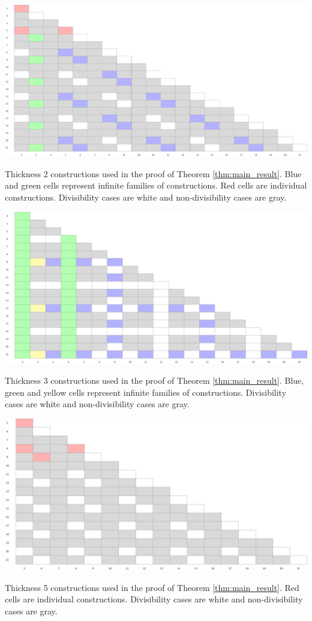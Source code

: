 \begin{table}[]
\centering
\includegraphics[width=\textwidth]{tables/2/thickness_2.pdf}
\caption{Thickness 2 constructions used in the proof of Theorem \ref{thm:main_result}. Blue and green cells represent infinite families of constructions. Red cells are individual constructions. Divisibility cases are white and non-divisibility cases are gray.}
\label{tab:integral_bounds_2}
\end{table} 

\begin{table}[]
\centering
\includegraphics[width=\textwidth]{tables/2/thickness_3.pdf}
\caption{Thickness 3 constructions used in the proof of Theorem \ref{thm:main_result}. Blue, green and yellow cells represent infinite families of constructions. Divisibility cases are white and non-divisibility cases are gray.}
\label{tab:integral_bounds_3}
\end{table} 

\begin{table}[]
\centering
\includegraphics[width=\textwidth]{tables/2/thickness_5.pdf}
\caption{Thickness 5 constructions used in the proof of Theorem \ref{thm:main_result}. Red cells are individual constructions. Divisibility cases are white and non-divisibility cases are gray.}
\label{tab:integral_bounds_5}
\end{table}

